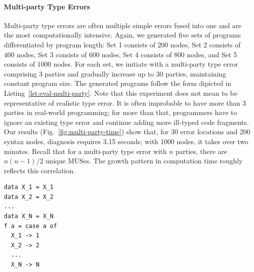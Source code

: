 \documentclass[pdflatex,lineno,sn-nature,Numbered]{sn-jnl}%
\begin{document}
\paragraph{Multi-party Type Errors}

Multi-party type errors are often multiple simple errors fused into one and are the most computationally intensive. Again, we generated five sets of programs differentiated by program length: Set 1 consists of 200 nodes, Set 2 consists of 400 nodes, Set 3 consists of 600 nodes, Set 4 consists of 800 nodes, and Set 5 consists of 1000 nodes. For each set, we initiate with a multi-party type error comprising 3 parties and gradually increase up to 30 parties, maintaining constant program size. The generated programs follow the form dipicted in Listing~\ref{lst:eval-multi-party}. Note that this experiment does not mean to be representative of realistic type error. It is often improbable to have more than 3 parties in real-world programming; for more than that, programmers have to ignore an existing type error and continue adding more ill-typed code fragments. Our results (Fig.~\ref{fig:multi-party-time}) show that, for 30 error locations and 200 syntax nodes, diagnosis requires 3.15 seconds; with 1000 nodes, it takes over two minutes. Recall that for a multi-party type error with $n$ parties, there are $n (n - 1) / 2$ unique MUSes. The growth pattern in computation time roughly reflects this correlation.

\begin{lstlisting}[caption={{\bf Multi-party error generation example}. To study the effect of multi-party type errors on performance, we generated programs with different number of $N$, ranging from 3 to 30.}, label={lst:eval-multi-party}]
data X_1 = X_1
data X_2 = X_2
...
data X_N = X_N
f a = case a of
  X_1 -> 1
  X_2 -> 2
  ...
  X_N -> N
\end{lstlisting}
\end{document}

